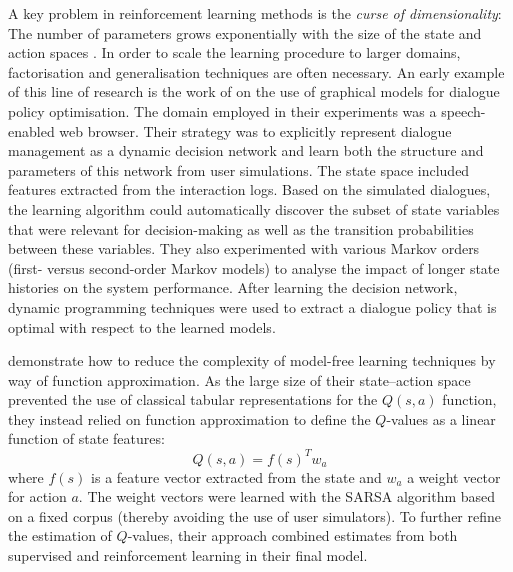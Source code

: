 A key problem in reinforcement learning methods is the \textit{curse of dimensionality}: The number of parameters grows exponentially with the size of the state and action spaces \citep{citeulike:112017}.  In order to scale the learning procedure to larger domains, factorisation and generalisation techniques are often necessary.  An early example of this line of research is the work of \cite{PaekC06} on the use of graphical models for dialogue policy optimisation. The domain employed in their experiments was a speech-enabled web browser.  Their strategy was to explicitly represent dialogue management as a dynamic decision network and learn both the structure and parameters of this network from user simulations.  The state space included features extracted from the interaction logs. Based on the simulated dialogues, the learning algorithm could automatically discover the subset of state variables that were relevant for decision-making as well as the transition probabilities between these variables.   They also experimented with various Markov orders (first- versus second-order Markov models) to analyse the impact of longer state histories on the system performance.  After learning the decision network, dynamic programming techniques were used to extract a dialogue policy that is optimal with respect to the learned models. %

\cite{Henderson:2008} demonstrate how to reduce the complexity of model-free learning techniques by way of function approximation.  As the large size of their state--action space prevented the use of classical tabular representations for the $Q(s,a)$ function, they instead relied on function approximation to define the $Q$-values as a linear function of state features:
\begin{equation}
Q(s,a) = f(s)^{T} w_a 
\end{equation}
where $f(s)$ is a feature vector extracted from the state and $w_a$ a weight vector for action $a$. The weight vectors were learned with the SARSA algorithm based on a fixed corpus (thereby avoiding the use of user simulators). To further refine the estimation of $Q$-values, their approach combined estimates from both supervised and reinforcement learning in their final model. 

